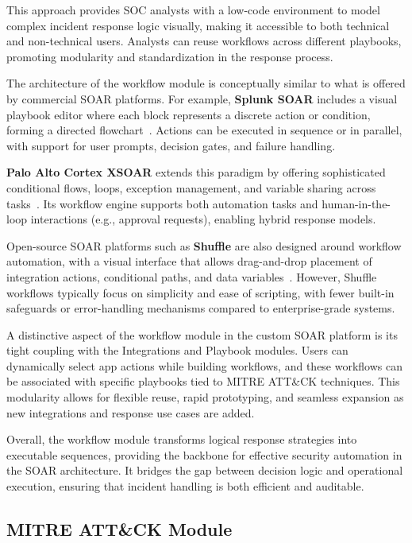 This approach provides SOC analysts with a low-code environment to model complex incident response logic visually, making it accessible to both technical and non-technical users. Analysts can reuse workflows across different playbooks, promoting modularity and standardization in the response process.

The architecture of the workflow module is conceptually similar to what is offered by commercial SOAR platforms. For example, \textbf{Splunk SOAR} includes a visual playbook editor where each block represents a discrete action or condition, forming a directed flowchart~\cite{splunk}. Actions can be executed in sequence or in parallel, with support for user prompts, decision gates, and failure handling.

\textbf{Palo Alto Cortex XSOAR} extends this paradigm by offering sophisticated conditional flows, loops, exception management, and variable sharing across tasks~\cite{paloalto}. Its workflow engine supports both automation tasks and human-in-the-loop interactions (e.g., approval requests), enabling hybrid response models.

Open-source SOAR platforms such as \textbf{Shuffle} are also designed around workflow automation, with a visual interface that allows drag-and-drop placement of integration actions, conditional paths, and data variables~\cite{techtarget}. However, Shuffle workflows typically focus on simplicity and ease of scripting, with fewer built-in safeguards or error-handling mechanisms compared to enterprise-grade systems.

A distinctive aspect of the workflow module in the custom SOAR platform is its tight coupling with the Integrations and Playbook modules. Users can dynamically select app actions while building workflows, and these workflows can be associated with specific playbooks tied to MITRE ATT\&CK techniques. This modularity allows for flexible reuse, rapid prototyping, and seamless expansion as new integrations and response use cases are added.

Overall, the workflow module transforms logical response strategies into executable sequences, providing the backbone for effective security automation in the SOAR architecture. It bridges the gap between decision logic and operational execution, ensuring that incident handling is both efficient and auditable.

\subsection{MITRE ATT\&CK Module}

